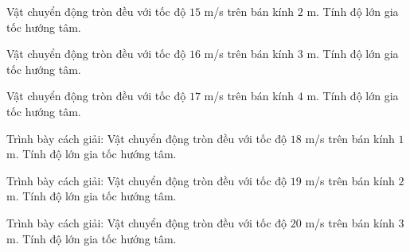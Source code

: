 \begin{ex}
Vật chuyển động tròn đều với tốc độ $15$ m/s trên bán kính $2$ m. Tính độ lớn gia tốc hướng tâm.
\end{ex}

\begin{ex}
Vật chuyển động tròn đều với tốc độ $16$ m/s trên bán kính $3$ m. Tính độ lớn gia tốc hướng tâm.
\end{ex}

\begin{ex}
Vật chuyển động tròn đều với tốc độ $17$ m/s trên bán kính $4$ m. Tính độ lớn gia tốc hướng tâm.
\end{ex}

\begin{bt}
Trình bày cách giải: Vật chuyển động tròn đều với tốc độ $18$ m/s trên bán kính $1$ m. Tính độ lớn gia tốc hướng tâm.
\end{bt}

\begin{bt}
Trình bày cách giải: Vật chuyển động tròn đều với tốc độ $19$ m/s trên bán kính $2$ m. Tính độ lớn gia tốc hướng tâm.
\end{bt}

\begin{bt}
Trình bày cách giải: Vật chuyển động tròn đều với tốc độ $20$ m/s trên bán kính $3$ m. Tính độ lớn gia tốc hướng tâm.
\end{bt}


